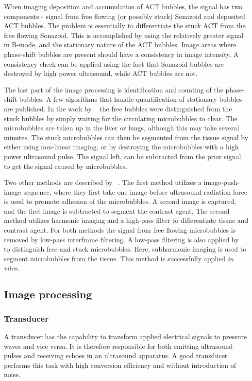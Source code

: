 When imaging deposition and accumulation of ACT\texttrademark{} bubbles, the signal has two components - signal from free flowing (or possibly stuck) Sonazoid\texttrademark{} and deposited ACT\texttrademark{} bubbles. The problem is essentially to differentiate the stuck ACT\texttrademark{} from the free flowing Sonazoid\texttrademark{}. This is accomplished by using the relatively greater signal in B-mode, and the stationary nature of the ACT\texttrademark{} bubbles. Image areas where phase-shift bubbles are present should have a consistency in image intensity. A consistency check can be applied using the fact that Sonazoid\texttrademark{} bubbles are destroyed by high power ultrasound, while ACT\texttrademark{} bubbles are not. 

The last part of the image processing is identification and counting of the phase-shift bubbles. A few algorithms that handle quantification of stationary bubbles are published. In the work by ~\citet{Rychak2006} the free bubbles were distinguished from the stuck bubbles by simply waiting for the circulating microbubbles to clear. The microbubbles are taken up in the liver or lungs, although this may take several minutes. The stuck microbubbles can then be segmented from the tissue signal by either using non-linear imaging, or by destroying the microbubbles with a high power ultrasound pulse. The signal left, can be subtracted from the prior signal to get the signal caused by microbubbles.

Two other methods are described by ~\citet{Zhao2007}. The first method utilizes a image-push-image sequence, where they first take one image before ultrasound radiation force is used to promote adhesion of the microbubbles. A second image is captured, and the first image is subtracted to segment the contrast agent. The second method utilizes harmonic imaging and a high-pass filter to differentiate tissue and contrast agent. For both methods the signal from free flowing microbubbles is removed by low-pass interframe filtering. A low-pass filtering is also applied by ~\citet{Needles2009} to distinguish free and stuck microbubbles. Here, subharmonic imaging is used to segment microbubbles from the tissue. This method is successfully applied \textit{in vitro}.  
\clearpage   
\subsection{Image processing}
\subsubsection{Transducer}
A transducer has the capability to transform applied electrical signals to pressure waves and vice versa. It is therefore responsible for both emitting ultrasound pulses and receiving echoes in an ultrasound apparatus. A good transducer performs this task with high conversion efficiency and without introduction of noise. 

